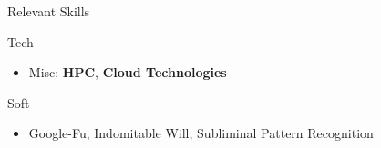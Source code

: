 \begin{cvsection}{Relevant Skills}
\begin{cvsubsection}{Tech}{}{}
\begin{itemize}
            
            \item Misc:
            \textbf{HPC}, \textbf{Cloud Technologies}
        \end{itemize}
    \end{cvsubsection}
 
  
    \begin{cvsubsection}{Soft}{}{}	
        \begin{itemize}
            \item Google-Fu, Indomitable Will, Subliminal Pattern Recognition
        \end{itemize}
    \end{cvsubsection}


\end{cvsection}
